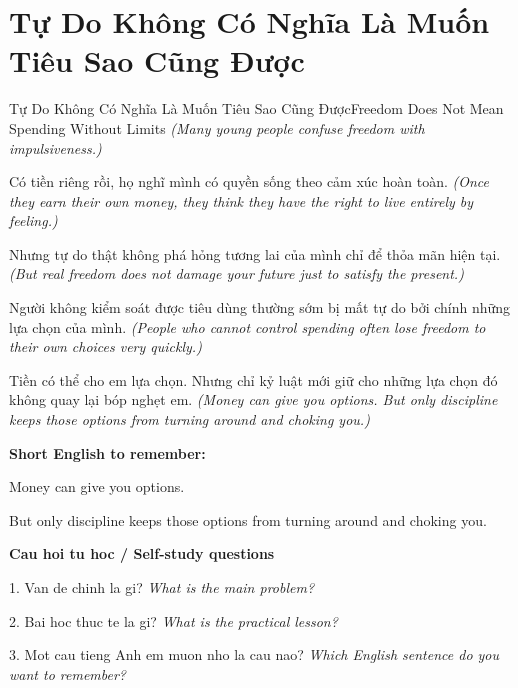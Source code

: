 \section{Tự Do Không Có Nghĩa Là Muốn Tiêu Sao Cũng Được}
\begin{truyen}{Tự Do Không Có Nghĩa Là Muốn Tiêu Sao Cũng Được}{Freedom Does Not Mean Spending Without Limits}
\textit{(Many young people confuse freedom with impulsiveness.)}

Có tiền riêng rồi, họ nghĩ mình có quyền sống theo cảm xúc hoàn toàn.
\textit{(Once they earn their own money, they think they have the right to live entirely by feeling.)}

Nhưng tự do thật không phá hỏng tương lai của mình chỉ để thỏa mãn hiện tại.
\textit{(But real freedom does not damage your future just to satisfy the present.)}

Người không kiểm soát được tiêu dùng thường sớm bị mất tự do bởi chính những lựa chọn của mình.
\textit{(People who cannot control spending often lose freedom to their own choices very quickly.)}

\end{truyen}

\begin{baihoc}
Tiền có thể cho em lựa chọn. Nhưng chỉ kỷ luật mới giữ cho những lựa chọn đó không quay lại bóp nghẹt em.
\textit{(Money can give you options. But only discipline keeps those options from turning around and choking you.)}
\end{baihoc}

\begin{ghinhoanh}
\textbf{Short English to remember:}

Money can give you options.

But only discipline keeps those options from turning around and choking you.

\end{ghinhoanh}

\begin{tuhocnhanh}
\textbf{Cau hoi tu hoc / Self-study questions}

1. Van de chinh la gi? \textit{What is the main problem?}

2. Bai hoc thuc te la gi? \textit{What is the practical lesson?}

3. Mot cau tieng Anh em muon nho la cau nao? \textit{Which English sentence do you want to remember?}
\end{tuhocnhanh}
\ngancach


